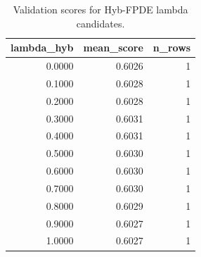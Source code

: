 \begin{table}[t]
\caption{Validation scores for Hyb-FPDE lambda candidates.}
\label{tab:lambda_distribution_computed}
\centering
\begin{tabular}{rrr}
\toprule
lambda\_hyb & mean\_score & n\_rows \\
\midrule
0.0000 & 0.6026 & 1 \\
0.1000 & 0.6028 & 1 \\
0.2000 & 0.6028 & 1 \\
0.3000 & 0.6031 & 1 \\
0.4000 & 0.6031 & 1 \\
0.5000 & 0.6030 & 1 \\
0.6000 & 0.6030 & 1 \\
0.7000 & 0.6030 & 1 \\
0.8000 & 0.6029 & 1 \\
0.9000 & 0.6027 & 1 \\
1.0000 & 0.6027 & 1 \\
\bottomrule
\end{tabular}

\end{table}

